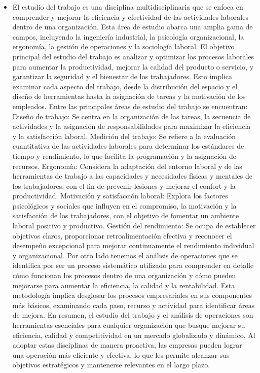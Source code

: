 \begin{itemize}
    \item El estudio del trabajo es una disciplina multidisciplinaria que se enfoca en comprender y mejorar la eficiencia y efectividad de las actividades laborales dentro de una organización. Esta área de estudio abarca una amplia gama de campos, incluyendo la ingeniería industrial, la psicología organizacional, la ergonomía, la gestión de operaciones y la sociología laboral.
El objetivo principal del estudio del trabajo es analizar y optimizar los procesos laborales para aumentar la productividad, mejorar la calidad del producto o servicio, y garantizar la seguridad y el bienestar de los trabajadores. Esto implica examinar cada aspecto del trabajo, desde la distribución del espacio y el diseño de herramientas hasta la asignación de tareas y la motivación de los empleados.
Entre las principales áreas de estudio del trabajo se encuentran:
Diseño de trabajo: Se centra en la organización de las tareas, la secuencia de actividades y la asignación de responsabilidades para maximizar la eficiencia y la satisfacción laboral.
Medición del trabajo: Se refiere a la evaluación cuantitativa de las actividades laborales para determinar los estándares de tiempo y rendimiento, lo que facilita la programación y la asignación de recursos.
Ergonomía: Considera la adaptación del entorno laboral y de las herramientas de trabajo a las capacidades y necesidades físicas y mentales de los trabajadores, con el fin de prevenir lesiones y mejorar el confort y la productividad.
Motivación y satisfacción laboral: Explora los factores psicológicos y sociales que influyen en el compromiso, la motivación y la satisfacción de los trabajadores, con el objetivo de fomentar un ambiente laboral positivo y productivo.
Gestión del rendimiento: Se ocupa de establecer objetivos claros, proporcionar retroalimentación efectiva y reconocer el desempeño excepcional para mejorar continuamente el rendimiento individual y organizacional.
Por otro lado tenemos el análisis de operaciones que se identifica por ser un proceso sistemático utilizado para comprender en detalle cómo funcionan los procesos dentro de una organización y cómo pueden mejorarse para aumentar la eficiencia, la calidad y la rentabilidad. Esta metodología implica desglosar los procesos empresariales en sus componentes más básicos, examinando cada paso, recurso y actividad para identificar áreas de mejora.
En resumen, el estudio del trabajo y el análisis de operaciones son herramientas esenciales para cualquier organización que busque mejorar su eficiencia, calidad y competitividad en un mercado globalizado y dinámico. Al adoptar estas disciplinas de manera proactiva, las empresas pueden lograr una operación más eficiente y efectiva, lo que les permite alcanzar sus objetivos estratégicos y mantenerse relevantes en el largo plazo.

\end{itemize}
